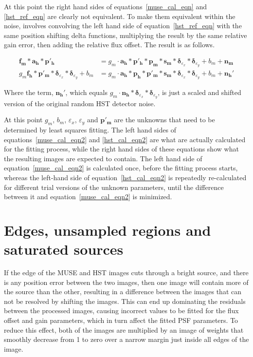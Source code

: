 \documentclass[12pt,twoside,a4paper]{article}
\newcommand{\msky}{\mathbf{s_m}}
\newcommand{\mpsf}{\mathbf{p_m}}
\newcommand{\hpsf}{\mathbf{p_h}}
\newcommand{\mepsf}{\mathbf{p'_m}}
\newcommand{\hepsf}{\mathbf{p'_h}}
\newcommand{\hlpf}{\mathbf{a_h}}
\newcommand{\mimg}{\mathbf{f_m}}
\newcommand{\himg}{\mathbf{f_h}}
\newcommand{\mnoise}{\mathbf{n_m}}
\newcommand{\hnoise}{\mathbf{n_h}}
\newcommand{\mdx}{\bm{\delta}_{\dx}}
\newcommand{\mdy}{\bm{\delta}_{\dy}}
\newcommand{\dx}{\varepsilon_x}
\newcommand{\dy}{\varepsilon_y}
\newcommand{\mgain}{g_m}
\newcommand{\mbg}{b_m}
\begin{document}
At this point the right hand sides of equations~\ref{muse_cal_eqn} and
\ref{hst_ref_eqn} are clearly not equivalent. To make them equivalent
within the noise, involves convolving the left hand side of
equation~\ref{hst_ref_eqn} with the same position shifting delta
functions, multiplying the result by the same relative gain error,
then adding the relative flux offset. The result is as follows.

\begin{align}
\label{muse_cal_eqn2}
\mimg \ast \hlpf \ast \hepsf
&= \mgain \cdot \hlpf \ast \hepsf \ast \mpsf \ast \msky \ast \mdx \ast \mdy + \mbg+\mnoise\\
\label{hst_cal_eqn2}
\mgain \himg \ast \mepsf \ast \mdx \ast \mdy + \mbg
&= \mgain \cdot \hlpf \ast \hpsf \ast \mepsf \ast \msky \ast \mdx \ast \mdy + \mbg + \hnoise'
\end{align}

Where the term, $\hnoise'$, which equals
$\mgain\cdot\hnoise\ast\mdx\ast\mdy$, is just a scaled and shifted
version of the original random HST detector noise.

At this point $\mgain$, $\mbg$, $\dx$, $\dy$ and $\mepsf$ are the
unknowns that need to be determined by least squares fitting. The left
hand sides of equations~\ref{muse_cal_eqn2} and \ref{hst_cal_eqn2} are
what are actually calculated for the fitting process, while the right
hand sides of these equations show what the resulting images are
expected to contain. The left hand side of
equation~\ref{muse_cal_eqn2} is calculated once, before the fitting
process starts, whereas the left-hand side of
equation~\ref{hst_cal_eqn2} is repeatedly re-calculated for different
trial versions of the unknown parameters, until the difference between
it and equation~\ref{muse_cal_eqn2} is minimized.

\section{Edges, unsampled regions and saturated sources}

If the edge of the MUSE and HST images cuts through a bright source,
and there is any position error between the two images, then one image
will contain more of the source than the other, resulting in a
difference between the images that can not be resolved by shifting the
images. This can end up dominating the residuals between the processed
images, causing incorrect values to be fitted for the flux offset and
gain parameters, which in turn affect the fitted PSF parameters.  To
reduce this effect, both of the images are multiplied by an image of
weights that smoothly decrease from 1 to zero over a narrow margin
just inside all edges of the image.
\end{document}
